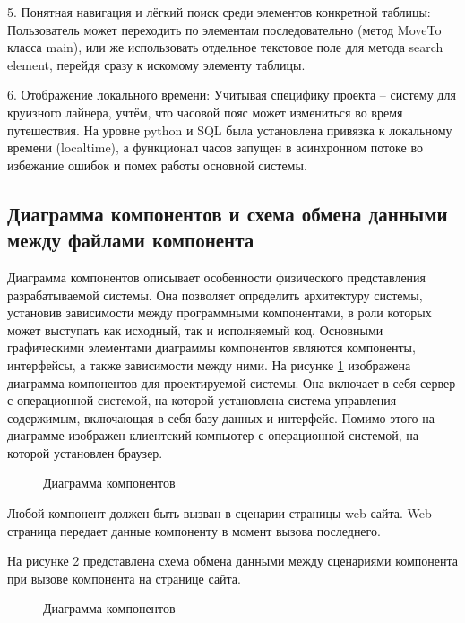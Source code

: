 5. Понятная навигация и лёгкий поиск среди элементов конкретной таблицы: Пользователь может переходить по элементам последовательно (метод MoveTo класса main), или же использовать отдельное текстовое поле для метода search\underline{ }element, перейдя сразу к искомому элементу таблицы.

6. Отображение локального времени: Учитывая специфику проекта -- систему для круизного лайнера, учтём, что часовой пояс может измениться во время путешествия. На уровне python и SQL была установлена привязка к локальному времени (localtime), а функционал часов запущен в асинхронном потоке во избежание ошибок и помех работы основной системы.

\subsection{Диаграмма компонентов и схема обмена данными между файлами компонента}

Диаграмма компонентов описывает особенности физического представления разрабатываемой системы. Она позволяет определить архитектуру системы, установив зависимости между программными компонентами, в роли которых может выступать как исходный, так и исполняемый код. Основными графическими элементами диаграммы компонентов являются компоненты, интерфейсы, а также зависимости между ними. На рисунке \ref{comp:image} изображена диаграмма компонентов для проектируемой системы. Она включает в себя сервер с операционной системой, на которой установлена система управления содержимым, включающая в себя базу данных и интерфейс. Помимо этого на диаграмме изображен клиентский компьютер с операционной системой, на которой установлен браузер.

\begin{figure}[ht]
\caption{Диаграмма компонентов}
\label{comp:image}
\end{figure}

Любой компонент должен быть вызван в сценарии страницы web-сайта. Web-страница передает данные компоненту в момент вызова последнего.

На рисунке \ref{data:image} представлена схема обмена данными между сценариями компонента при вызове компонента на странице сайта.

\begin{figure}[ht]
\caption{Диаграмма компонентов}
\label{data:image}
\end{figure}

